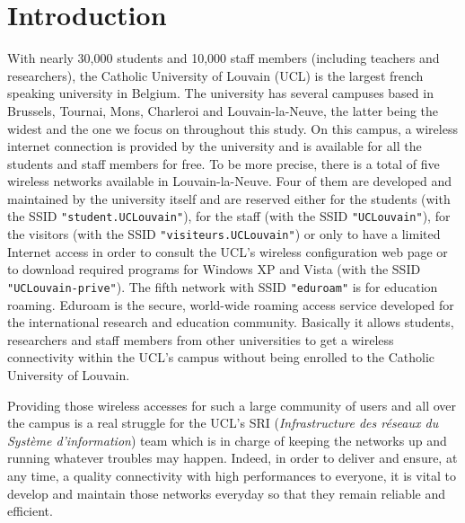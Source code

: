 
\chapter{Introduction} %

\label{Chapter1} %


With nearly 30,000 students and 10,000 staff members (including teachers and researchers), the Catholic University of Louvain (UCL) is the largest french speaking university in Belgium. The university has several campuses based in Brussels, Tournai, Mons, Charleroi and Louvain-la-Neuve, the latter being the widest and the one we focus on throughout this study. On this campus, a wireless internet connection is provided by the university and is available for all the students and staff members for free. To be more precise, there is a total of five wireless networks available in Louvain-la-Neuve. Four of them are developed and maintained by the university itself and are reserved either for the students (with the SSID \texttt{"student.UCLouvain"}), for the staff (with the SSID \texttt{"UCLouvain"}), for the visitors (with the SSID \texttt{"visiteurs.UCLouvain"}) or only to have a limited Internet access in order to consult the UCL's wireless configuration web page or to download required programs  for Windows XP and Vista (with the SSID \texttt{"UCLouvain-prive"}). The fifth network with SSID \texttt{"eduroam"} is for education roaming. Eduroam is the secure, world-wide roaming access service developed for the international research and education community\cite{eduroam1}. Basically it allows students, researchers and staff members from other universities to get a wireless connectivity within the UCL's campus without being enrolled to the Catholic University of Louvain.

Providing those wireless accesses for such a large community of users and all over the campus is a real struggle for the UCL's SRI (\textit{Infrastructure des réseaux du Système d'information}) team which is in charge of keeping the networks up and running whatever troubles may happen. Indeed, in order to deliver and ensure, at any time, a quality connectivity with high performances to everyone, it is vital to develop and maintain those networks everyday so that they remain reliable and efficient.
 

